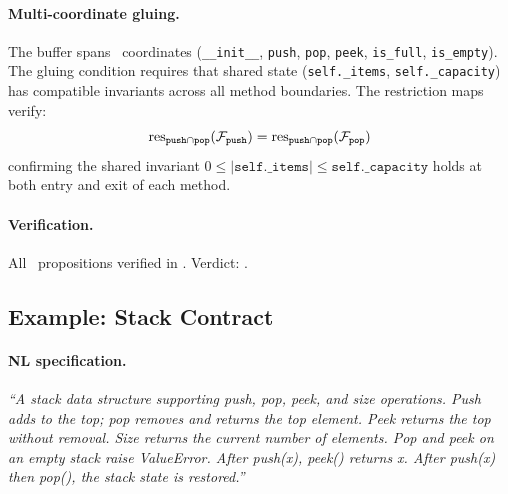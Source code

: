\documentclass[11pt]{article}
\begin{document}
\paragraph{Multi-coordinate gluing.}
The buffer spans \ppLXXnlboundedbufferCoords\ coordinates
(\texttt{\_\_init\_\_}, \texttt{push}, \texttt{pop}, \texttt{peek},
\texttt{is\_full}, \texttt{is\_empty}).  The gluing condition requires
that shared state (\texttt{self.\_items}, \texttt{self.\_capacity})
has compatible invariants across all method boundaries.
The restriction maps verify:
\[
\mathrm{res}_{\texttt{push} \cap \texttt{pop}}(\mathcal{F}_{\texttt{push}})
= \mathrm{res}_{\texttt{push} \cap \texttt{pop}}(\mathcal{F}_{\texttt{pop}})
\]
confirming the shared invariant
$0 \leq |\texttt{self.\_items}| \leq \texttt{self.\_capacity}$
holds at both entry and exit of each method.

\paragraph{Verification.}
All \ppLXXnlboundedbufferOk\ propositions verified in
\ppLXXnlboundedbufferTime.
Verdict: \ppLXXnlboundedbufferVerdict.

\subsection{Example: Stack Contract}\label{sec:ex-stack}

\paragraph{NL specification.}
\emph{``A stack data structure supporting push, pop, peek, and size
operations.  Push adds to the top; pop removes and returns the top
element.  Peek returns the top without removal.  Size returns the
current number of elements.  Pop and peek on an empty stack raise
ValueError.  After push(x), peek() returns x.  After push(x) then
pop(), the stack state is restored.''}
\end{document}
